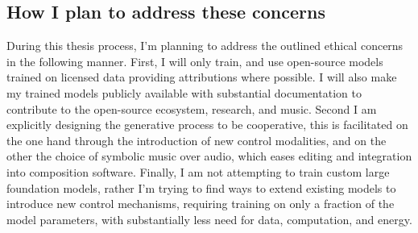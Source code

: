 \subsection{How  I plan to address these concerns}
During this thesis process, I’m planning to address the outlined ethical concerns in the following manner. First, I will only train, and use open-source models trained on licensed data providing attributions where possible. I will also make my trained models publicly available with substantial documentation to contribute to the open-source ecosystem, research, and music. Second I am explicitly designing the generative process to be cooperative, this is facilitated on the one hand through the introduction of new control modalities, and on the other the choice of symbolic music over audio, which eases editing and integration into composition software. Finally, I am not attempting to train custom large foundation models, rather I’m trying to find ways to extend existing models to introduce new control mechanisms, requiring training on only a fraction of the model parameters, with substantially less need for data, computation, and energy. 



